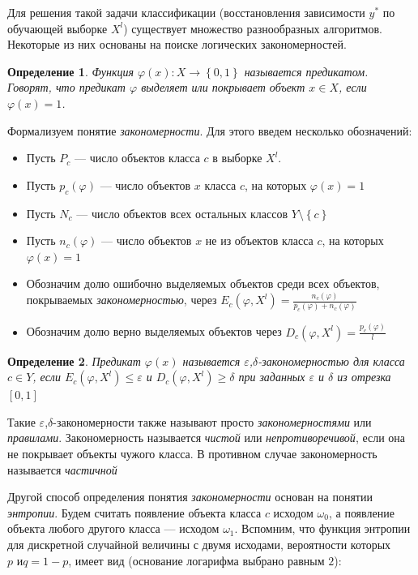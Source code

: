 \documentclass[12pt]{article}
\newtheorem{definition}{Определение}
\begin{document}
Для решения такой задачи классификации (восстановления зависимости
\(y^{*}\) по обучающей выборке \(X^l\)) существует множество
разнообразных алгоритмов. Некоторые из них основаны на поиске
логических закономерностей.

\begin{definition}
  Функция \(\varphi(x) \colon X \rightarrow \left\{0, 1\right\}\)
  называется \emph{предикатом}. Говорят, что предикат
  \(\varphi\) \emph{выделяет} или \emph{покрывает} объект \(x \in X\),
  если \(\varphi(x) = 1\).
\end{definition}

Формализуем понятие \emph{закономерности}. Для этого введем несколько
обозначений:

\begin{itemize}
\item Пусть \(P_c\) --- число объектов класса \(c\) в выборке \(X^l\).
\item Пусть \(p_c(\varphi)\) --- число объектов \(x\) класса \(c\), на
  которых \(\varphi(x) = 1\)
\item Пусть \(N_c\) --- число объектов всех остальных классов \(Y
  \setminus \left\{c\right\}\)
\item Пусть \(n_c(\varphi)\) --- число объектов \(x\) не из объектов
  класса \(c\), на которых \(\varphi(x) = 1\)
\item Обозначим долю ошибочно выделяемых объектов среди всех объектов,
  покрываемых \emph{закономерностью}, через \(E_c(\varphi, X^l) =
  \frac{n_c(\varphi)}{p_c(\varphi) + n_c(\varphi)}\)
\item Обозначим долю верно выделяемых объектов через \(D_c(\varphi,
  X^l) = \frac{p_c(\varphi)}{l}\)
\end{itemize}

\begin{definition}
  Предикат \(\varphi(x)\) называется
  \emph{\(\varepsilon\),\(\delta\)-закономерностью} для класса \(c \in
  Y\), если \(E_c(\varphi, X^l) \leq \varepsilon \) и \(D_c(\varphi,
  X^l)\geq\delta\) при заданных \(\varepsilon\) и \(\delta\) из
  отрезка \([0, 1]\)
\end{definition}

Такие \(\varepsilon\),\(\delta\)-закономерности также называют просто
\emph{закономерностями} или \emph{правилами}. Закономерность
называется \emph{чистой} или \emph{непротиворечивой}, если она не
покрывает объекты чужого класса. В противном случае закономерность
называется \emph{частичной}

Другой способ определения понятия \emph{закономерности} основан на
понятии \emph{энтропии}. Будем считать появление объекта класса \(c\)
исходом \(\omega_0\), а появление объекта любого другого класса ---
исходом \(\omega_1\). Вспомним, что функция энтропии для дискретной
случайной величины с двумя исходами, вероятности которых \(p \text{ и
} q = 1 - p\), имеет вид (основание логарифма выбрано равным \(2\)):
\end{document}
